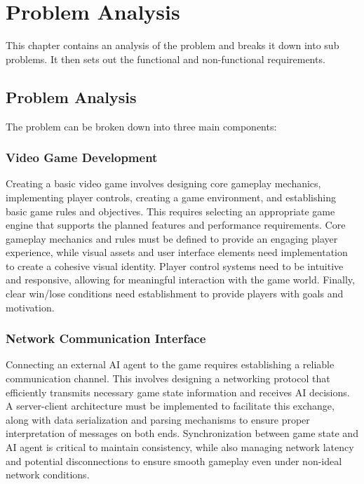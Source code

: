 \chapter{Problem Analysis}

This chapter contains an analysis of the problem and breaks it down into sub problems. It then sets out the functional and non-functional requirements.

\section{Problem Analysis}
The problem can be broken down into three main components:

\subsection{Video Game Development}
Creating a basic video game involves designing core gameplay mechanics, implementing player controls, creating a game environment, and establishing basic game rules and objectives. 
This requires selecting an appropriate game engine that supports the planned features and performance requirements. 
Core gameplay mechanics and rules must be defined to provide an engaging player experience, while visual assets and user interface elements need implementation to create a cohesive visual identity. 
Player control systems need to be intuitive and responsive, allowing for meaningful interaction with the game world. Finally, clear win/lose conditions need establishment to provide players with goals and motivation.

\subsection{Network Communication Interface}
Connecting an external AI agent to the game requires establishing a reliable communication channel. 
This involves designing a networking protocol that efficiently transmits necessary game state information and receives AI decisions. 
A server-client architecture must be implemented to facilitate this exchange, along with data serialization and parsing mechanisms to ensure proper interpretation of messages on both ends. 
Synchronization between game state and AI agent is critical to maintain consistency, while also managing network latency and potential disconnections to ensure smooth gameplay even under non-ideal network conditions.

